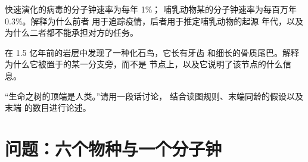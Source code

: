 \begin{exercise}[$\star\star\star$]\label{exo:g12:phylogenetic-trees:13}
快速演化的病毒的分子钟速率为每年 1\%；
哺乳动物某的分子钟速率为每百万年 0.3\%。解释为什么前者
用于追踪疫情，后者用于推定哺乳动物的起源
年代，以及为什么二者都不能承担对方的任务。
\end{exercise}

\begin{exercise}[$\star\star\star$]\label{exo:g12:phylogenetic-trees:14}
在 1.5 亿年前的岩层中发现了一种化石鸟，它长有牙齿
和细长的骨质尾巴。解释为什么它被置于的某一分支旁，而不是
节点上，以及它说明了该节点的什么信息。
\end{exercise}

\begin{exercise}[$\star\star\star$]\label{exo:g12:phylogenetic-trees:15}
“生命之树的顶端是人类。”请用一段话讨论，
结合读图规则、末端同龄的假设以及末端
的数目进行论述。
\end{exercise}

\section{问题：六个物种与一个分子钟}

